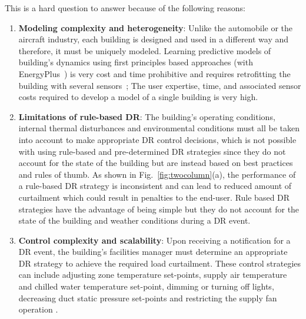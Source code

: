 \documentclass{sig-alternate-ipsn13}
\theoremstyle{definition}
\begin{document}
This is a hard question to answer because of the following reasons:
\begin{enumerate}[leftmargin=0.5cm,topsep=1pt,itemsep=-1ex,partopsep=1ex,parsep=1ex]
\item \textbf{Modeling complexity and heterogeneity}: Unlike the automobile or the aircraft industry, each building is designed and used in a different way and therefore, it must be uniquely modeled. 
Learning predictive models of building's dynamics using first principles based approaches (\eg with EnergyPlus~\cite{Crawley2001319}) is very cost and time prohibitive and requires retrofitting the building with several sensors~\cite{sturzeneggermodel};
The user expertise, time, and associated sensor costs required to develop a model of a single building is very high.
\item \textbf{Limitations of rule-based DR}: The building's operating conditions, internal thermal disturbances and environmental conditions must all be taken into account to make appropriate DR control decisions, which is not possible with using rule-based and pre-determined DR strategies since they do not account for the state of the building but are instead based on best practices and rules of thumb. As shown in Fig.~\ref{fig:twocolumn}(a), the performance of a rule-based DR strategy is inconsistent and can lead to reduced amount of curtailment which could result in penalties to the end-user. 
Rule based DR strategies have the advantage of being simple but they do not account for the state of the building and weather conditions during a DR event.
\item \textbf{Control complexity and scalability}: Upon receiving a notification for a DR event, the building's facilities manager must determine an appropriate DR strategy to achieve the required load curtailment. 
These control strategies can include adjusting zone temperature set-points, supply air temperature and chilled water temperature set-point, dimming or turning off lights, decreasing duct static pressure set-points and restricting the supply fan operation \etc. 

\end{enumerate}
\end{document}
